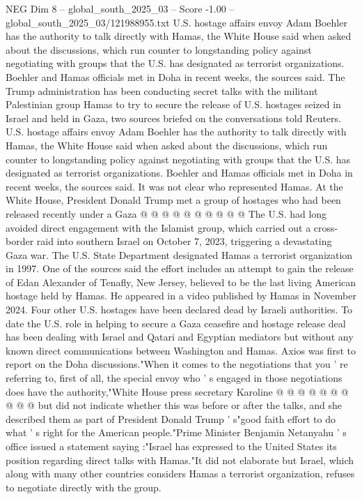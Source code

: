\begin{textsample}{NEG Dim 8 – global\_south\_2025\_03 – Score -1.00 – global\_south\_2025\_03/121988955.txt}  \label{ex:f8_neg_303}
U.S. hostage affairs envoy Adam Boehler has the authority to talk directly with Hamas, the White House said when asked about the discussions, which run counter to longstanding policy against negotiating with groups that the U.S. has designated as terrorist organizations.
Boehler and Hamas officials met in Doha in recent weeks, the sources said.
The Trump administration has been conducting secret talks with the militant Palestinian group Hamas to try to secure the release of U.S. hostages seized in Israel and held in Gaza, two sources briefed on the conversations told Reuters.
U.S. hostage affairs envoy Adam Boehler has the authority to talk directly with Hamas, the White House said when asked about the discussions, which run counter to longstanding policy against negotiating with groups that the U.S. has designated as terrorist organizations.
Boehler and Hamas officials met in Doha in recent weeks, the sources said.
It was not clear who represented Hamas.
At the White House, President Donald Trump met a group of hostages who had been released recently under a Gaza @ @ @ @ @ @ @ @ @ @ The U.S. had long avoided direct engagement with the Islamist group, which carried out a cross-border raid into southern Israel on October 7, 2023, triggering a devastating Gaza war.
The U.S.
State Department designated Hamas a terrorist organization in 1997.
One of the sources said the effort includes an attempt to gain the release of Edan Alexander of Tenafly, New Jersey, believed to be the last living American hostage held by Hamas.
He appeared in a video published by Hamas in November 2024.
Four other U.S. hostages have been declared dead by Israeli authorities.
To date the U.S. role in helping to secure a Gaza ceasefire and hostage release deal has been dealing with Israel and Qatari and Egyptian mediators but without any known direct communications between Washington and Hamas.
Axios was first to report on the Doha discussions."When it comes to the negotiations that you ' re referring to, first of all, the special envoy who ' s engaged in those negotiations does have the authority,"White House press secretary Karoline @ @ @ @ @ @ @ @ @ @ but did not indicate whether this was before or after the talks, and she described them as part of President Donald Trump ' s"good faith effort to do what ' s right for the American people."Prime Minister Benjamin Netanyahu ' s office issued a statement saying :"Israel has expressed to the United States its position regarding direct talks with Hamas."It did not elaborate but Israel, which along with many other countries considers Hamas a terrorist organization, refuses to negotiate directly with the group.

\end{textsample}
